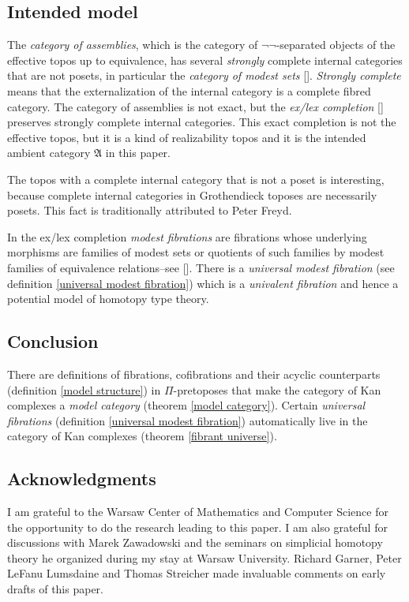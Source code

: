 \documentclass{tac}
\newcommand\citep[1]{[\cite{#1}]}
\newcommand\ambient{\mathfrak A}
\begin{document}
\subsection*{Intended model} The \emph{category of assemblies}, which is the category of $\neg\neg$-separated objects of the effective topos up to equivalence, has several \emph{strongly} complete internal categories that are not posets, in particular the \emph{category of modest sets} \citep{MR1097022,MR2479466,MR1023803}. \emph{Strongly complete} means that the externalization of the internal category is a complete fibred category. The category of assemblies is not exact, but the \emph{ex/lex completion} \citep{MR1600009} preserves strongly complete internal categories. This exact completion is not the effective topos, but it is a kind of realizability topos and it is the intended ambient category $\ambient$ in this paper. 

The topos with a complete internal category that is not a poset is interesting, because complete internal categories in Grothendieck toposes are necessarily posets. This fact is traditionally attributed to Peter Freyd.

In the ex/lex completion \emph{modest fibrations} are fibrations whose underlying morphisms are families of modest sets or quotients of such families by modest families of equivalence relations--see \citep{MR1097022,MR1023803,MR2479466}. There is a \emph{universal modest fibration} (see definition \ref{universal modest fibration}) which is a \emph{univalent fibration} and hence a potential model of homotopy type theory.

\subsection*{Conclusion} There are definitions of fibrations, cofibrations and their acyclic counterparts (definition \ref{model structure}) in $\Pi$-pretoposes that make the category of Kan complexes a \emph{model category} (theorem \ref{model category}). Certain \emph{universal fibrations} (definition \ref{universal modest fibration}) automatically live in the category of Kan complexes (theorem \ref{fibrant universe}).

\subsection*{Acknowledgments} 
I am grateful to the Warsaw Center of Mathematics and Computer Science for the opportunity to do the research leading to this paper. I am also grateful for discussions with Marek Zawadowski and the seminars on simplicial homotopy theory he organized during my stay at Warsaw University. Richard Garner, Peter LeFanu Lumsdaine and Thomas Streicher made invaluable comments on early drafts of this paper.
\end{document}
